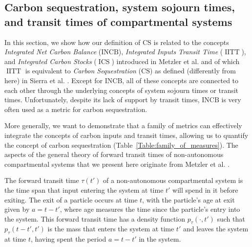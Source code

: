 \documentclass[9pt,twoside,lineno]{pnas-new_SI}
\newcommand{\CS}{\mathrm{CS}}
\newcommand{\INCB}{\mathrm{INCB}}
\newcommand{\IITT}{\operatorname{IITT}}
\newcommand{\ICS}{\operatorname{ICS}}
\begin{document}
\subsection*{Carbon sequestration, system sojourn times, and transit times of compartmental systems}
In this section, we show how our definition of $\CS$ is related to the concepts 
\emph{Integrated Net Carbon Balance} ($\INCB$), \emph{Integrated Inputs Transit Time} ($\IITT$), and \emph{Integrated Carbon Stocks} ($\ICS$) introduced in Metzler et al. \cite{Metzler2024} and of which $\IITT$ is equivalent to \emph{Carbon Sequestration} ($\CS$) as defined (differently from here) in Sierra et al. \cite{Sierra2021}.
Except for $\INCB$, all of these concepts are connected to each other through the underlying concepts of system sojourn times or transit times.
Unfortunately, despite its lack of support by transit times, $\INCB$ is very often used as a metric for carbon sequestration.

More generally, we want to demonstrate that a family of metrics can effectively integrate the concepts of carbon inputs and transit times, allowing us to quantify the concept of carbon sequestration (Table~\ref{Table:family_of_measures}).
The aspects of the general theory of forward transit times of non-autonomous compartmental systems that we present here originate from Metzler et al. \cite{Metzler2018PNAS}.

The forward transit time $\tau(t')$ of a non-autonomous compartmental system is the time span that input entering the system at time $t'$ will spend in it before exiting.
The exit of a particle occurs at time $t$, with the particle's age at exit given by $a=t-t'$, where age measures the time since the particle's entry into the system.
This forward transit time has a density function $p_\tau(\cdot,t')$ such that $p_\tau(t-t',t')$ is the mass that enters the system at time $t'$ and leaves the system at time $t$, having spent the period $a=t-t'$ in the system.
\end{document}
